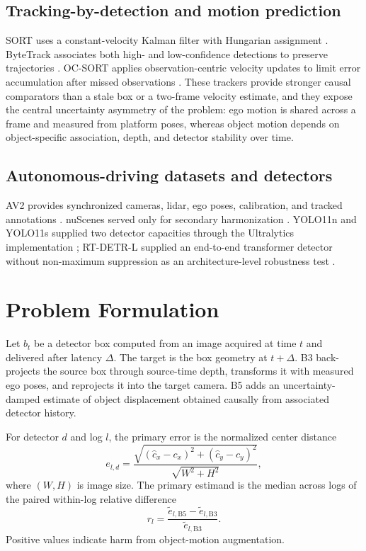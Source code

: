 \documentclass[journal]{IEEEtran}
\begin{document}
\subsection{Tracking-by-detection and motion prediction}
SORT uses a constant-velocity Kalman filter with Hungarian assignment \cite{Bewley2016SORT,Kuhn1955}. ByteTrack associates both high- and low-confidence detections to preserve trajectories \cite{Zhang2022ByteTrack}. OC-SORT applies observation-centric velocity updates to limit error accumulation after missed observations \cite{Cao2023OCSORT}. These trackers provide stronger causal comparators than a stale box or a two-frame velocity estimate, and they expose the central uncertainty asymmetry of the problem: ego motion is shared across a frame and measured from platform poses, whereas object motion depends on object-specific association, depth, and detector stability over time.

\subsection{Autonomous-driving datasets and detectors}
AV2 provides synchronized cameras, lidar, ego poses, calibration, and tracked annotations \cite{Wilson2021AV2}. nuScenes served only for secondary harmonization \cite{Caesar2020nuScenes}. YOLO11n and YOLO11s supplied two detector capacities through the Ultralytics implementation \cite{Ultralytics2024}; RT-DETR-L supplied an end-to-end transformer detector without non-maximum suppression as an architecture-level robustness test \cite{Zhao2024RTDETR}.

\section{Problem Formulation}
Let $b_t$ be a detector box computed from an image acquired at time $t$ and delivered after latency $\Delta$. The target is the box geometry at $t+\Delta$. B3 back-projects the source box through source-time depth, transforms it with measured ego poses, and reprojects it into the target camera. B5 adds an uncertainty-damped estimate of object displacement obtained causally from associated detector history.

For detector $d$ and log $l$, the primary error is the normalized center distance
\begin{equation}
 e_{l,d}=\frac{\sqrt{(\hat c_x-c_x)^2+(\hat c_y-c_y)^2}}
 {\sqrt{W^2+H^2}},
\end{equation}
where $(W,H)$ is image size. The primary estimand is the median across logs of the paired within-log relative difference
\begin{equation}
 r_l=\frac{\widetilde e_{l,\mathrm{B5}}-\widetilde e_{l,\mathrm{B3}}}
 {\widetilde e_{l,\mathrm{B3}}}.
\end{equation}
Positive values indicate harm from object-motion augmentation.
\end{document}
